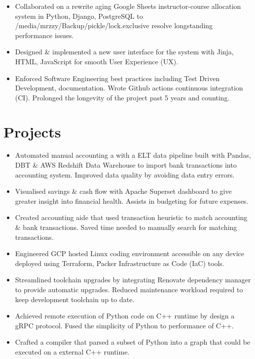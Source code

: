 \begin{itemize}
  \item Collaborated on a rewrite aging Google Sheets instructor-course allocation system in Python, Django, PostgreSQL to 
 /media/mrzzy/Backup/pickle/lock.exclusive   resolve longstanding performance issues. 
  \item Designed \& implemented a new user interface 
    for the system with Jinja, HTML, JavaScript for smooth User Experience (UX).
  \item Enforced Software Engineering best practices including Test Driven Development,
    documentation. Wrote Github actions continuous integration (CI). 
    Prolonged the longevity of the project past 5 years and counting.
\end{itemize}

\section{Projects}

\begin{itemize}
  \item Automated manual accounting a with a ELT data pipeline built with Pandas, DBT \& AWS Redshift Data Warehouse to import bank transactions into accounting system. Improved data quality by avoiding data entry errors.
  \item Visualised savings \& cash flow with Apache Superset dashboard to give greater insight into financial health. Assists in budgeting for future expenses.
  \item Created accounting aide that used transaction heuristic to match accounting \& bank transactions. Saved time needed to manually search for matching transactions.
\end{itemize}

\begin{itemize}
  \item Engineered GCP hosted Linux coding environment accessible on any device deployed using Terraform,
    Packer Infrastructure as Code (IaC) tools.
  \item Streamlined toolchain upgrades by integrating Renovate dependency manager to provide automatic upgrades. Reduced maintenance workload required to keep development toolchain up to date.
\end{itemize}
\begin{itemize}
\item Achieved remote execution of Python code on C++ runtime by design a gRPC protocol. Fused the simplicity of Python to performance of C++.
\item Crafted a compiler that parsed a subset of Python into a graph that could be executed on a external C++ runtime.
\end{itemize}
  

